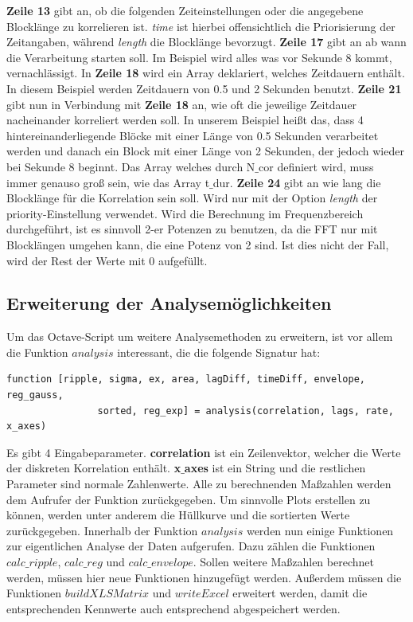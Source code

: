 \textbf{Zeile 13} gibt an, ob die folgenden Zeiteinstellungen oder die angegebene Blocklänge zu korrelieren ist. \textit{time} ist hierbei offensichtlich die Priorisierung der Zeitangaben, während \textit{length} die Blocklänge bevorzugt.\newline
\textbf{Zeile 17} gibt an ab wann die Verarbeitung starten soll. Im Beispiel wird alles was vor Sekunde 8 kommt, vernachlässigt. \newline
In \textbf{Zeile 18} wird ein Array deklariert, welches Zeitdauern enthält. In diesem Beispiel werden Zeitdauern von 0.5 und 2 Sekunden benutzt. \newline
\textbf{Zeile 21} gibt nun in Verbindung mit \textbf{Zeile 18} an, wie oft die jeweilige Zeitdauer nacheinander korreliert werden soll. In unserem Beispiel heißt das, dass 4 hintereinanderliegende Blöcke mit einer Länge von 0.5 Sekunden verarbeitet werden und danach ein Block mit einer Länge von 2 Sekunden, der jedoch wieder bei Sekunde 8 beginnt. Das Array welches durch N$\_$cor definiert wird, muss immer genauso groß sein, wie das Array t$\_$dur.\newline 
\textbf{Zeile 24} gibt an wie lang die Blocklänge für die Korrelation sein soll. Wird nur mit der Option \textit{length} der priority-Einstellung verwendet. Wird die Berechnung im Frequenzbereich durchgeführt, ist es sinnvoll 2-er Potenzen zu benutzen, da die FFT nur mit Blocklängen umgehen kann, die eine Potenz von 2 sind. Ist dies nicht der Fall, wird der Rest der Werte mit 0 aufgefüllt.\newline

\subsection{Erweiterung der Analysemöglichkeiten}
Um das Octave-Script um weitere Analysemethoden zu erweitern, ist vor allem die Funktion $analysis$ interessant, die die folgende Signatur hat:
\begin{lstlisting}
function [ripple, sigma, ex, area, lagDiff, timeDiff, envelope, reg_gauss, 
                sorted, reg_exp] = analysis(correlation, lags, rate, x_axes)
\end{lstlisting}
Es gibt 4 Eingabeparameter. \textbf{correlation} ist ein Zeilenvektor, welcher die Werte der diskreten Korrelation enthält. \textbf{x$\_$axes} ist ein String und die restlichen Parameter sind normale Zahlenwerte. Alle zu berechnenden Maßzahlen werden dem Aufrufer der Funktion zurückgegeben. Um sinnvolle Plots erstellen zu können, werden unter anderem die Hüllkurve und die sortierten Werte zurückgegeben.  
Innerhalb der Funktion $analysis$ werden nun einige Funktionen zur eigentlichen Analyse der Daten aufgerufen. Dazu zählen die Funktionen $calc\_ripple$, $calc\_reg$ und $calc\_envelope$. Sollen weitere Maßzahlen berechnet werden, müssen hier neue Funktionen hinzugefügt werden. Außerdem müssen die Funktionen $buildXLSMatrix$ und $writeExcel$ erweitert werden, damit die entsprechenden Kennwerte auch entsprechend abgespeichert werden.
